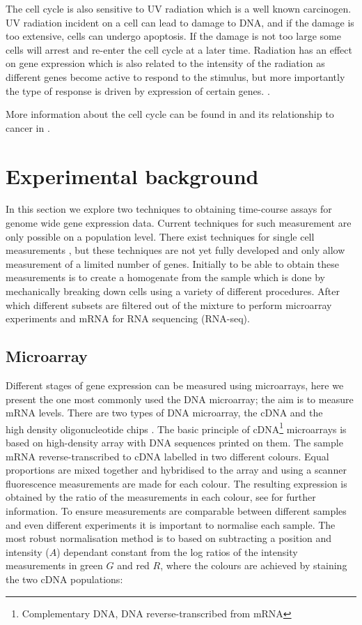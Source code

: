 The cell cycle is also sensitive to UV radiation which is a well known carcinogen. UV radiation incident on a cell can lead to damage to DNA, and if the damage is too extensive, cells can undergo apoptosis. If the damage is not too large some cells will arrest and re-enter the cell cycle at a later time. Radiation has an effect on gene expression which is also related to the intensity of the radiation as different genes become active to respond to the stimulus, but more importantly the type of response is driven by expression of certain genes. \citep{Gentile:2003in}. 

More information about the cell cycle can be found in \cite[Chapter~17]{Alberts:2007tv} and its relationship to cancer in \cite[Chapter~8]{Weinberg:2013uu}.


\section{Experimental background}
\label{sec:exper-backgr}

In this section we explore two techniques to obtaining time-course assays for genome wide gene expression data. Current techniques for such measurement are only possible on a population level. There exist techniques for single cell measurements \citep{Buganim:2012hp}, but these techniques are not yet fully developed and only allow measurement of a limited number of genes. Initially to be able to obtain these measurements is to create a homogenate from the sample which is done by mechanically breaking down cells using a variety of different procedures. After which different subsets are filtered out of the mixture to perform microarray experiments and mRNA for RNA sequencing (RNA-seq). 

\subsection{Microarray}
\label{sec:microarray}

Different stages of gene expression can be measured using microarrays, here we present the one most commonly used the DNA microarray; the aim is to measure mRNA levels. There are two types of DNA microarray, the cDNA \citep{Hughes:2001ho} and the high􏰄density oligonucleotide chips \citep{Lockhart:1996jw}. The basic principle of cDNA\footnote{Complementary DNA, DNA reverse-transcribed from mRNA} microarrays is based on high-density array with DNA sequences printed on them. The sample mRNA reverse-transcribed to cDNA labelled in two different colours. Equal proportions are mixed together and hybridised to the array and using a scanner fluorescence measurements are made for each colour. The resulting expression is obtained by the ratio of the measurements in each colour, see \cite{phimister1999chipping} for further information. To ensure measurements are comparable between different samples and even different experiments it is important to normalise each sample. The most robust normalisation method is to based on subtracting a position and intensity ($A$) dependant constant from the log ratios of the intensity measurements in green $G$ and red $R$, where the colours are achieved by staining the two cDNA populations:

